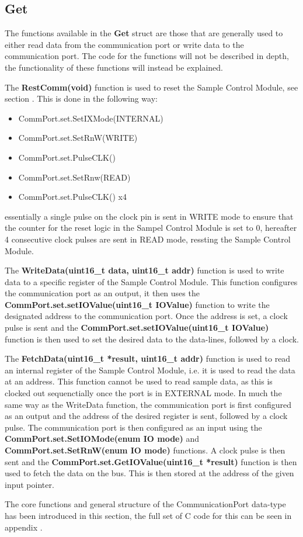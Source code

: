 \subsection*{Get}
The functions available in the \textbf{Get} struct are those that are generally used to either read data from the communication port or write data to the communication port. The code for the functions will not be described in depth, the functionality of these functions will instead be explained. 

The \textbf{RestComm(void)} function is used to reset the Sample Control Module, see section . This is done in the following way:
\begin{itemize}
    \item CommPort.set.SetIXMode(INTERNAL)
    \item CommPort.set.SetRnW(WRITE)
    \item CommPort.set.PulseCLK()
    \item CommPort.set.SetRnw(READ)
    \item CommPort.set.PulseCLK() x4
\end{itemize}

essentially a single pulse on the clock pin is sent in WRITE mode to ensure that the counter for the reset logic in the Sampel Control Module is set to 0, hereafter 4 consecutive clock pulses are sent in READ mode, ressting the Sample Control Module.

The \textbf{WriteData(uint16\_t data, uint16\_t addr)} function is used to write data to a specific register of the Sample Control Module. This function configures the communication port as an output, it then uses the \textbf{CommPort.set.setIOValue(uint16\_t IOValue)} function to write the designated address to the communication port. Once the address is set, a clock pulse is sent and the \textbf{CommPort.set.setIOValue(uint16\_t IOValue)} function is then used to set the desired data to the data-lines, followed by a clock. 

The \textbf{FetchData(uint16\_t *result, uint16\_t addr)} function is used to read an internal register of the Sample Control Module, i.e. it is used to read the data at an address. This function cannot be used to read sample data, as this is clocked out sequenctially once the port is in EXTERNAL mode. In much the same way as the WriteData function, the communication port is first configured as an output and the address of the desired register is sent, followed by a clock pulse. The communication port is then configured as an input using the \textbf{CommPort.set.SetIOMode(enum IO mode)} and \textbf{CommPort.set.SetRnW(enum IO mode)} functions. A clock pulse is then sent and the \textbf{CommPort.set.GetIOValue(uint16\_t *result)} function is then used to fetch the data on the bus. This is then stored at the address of the given input pointer. 

The core functions and general structure of the CommunicationPort data-type has been introduced in this section, the full set of C code for this can be seen in appendix .

